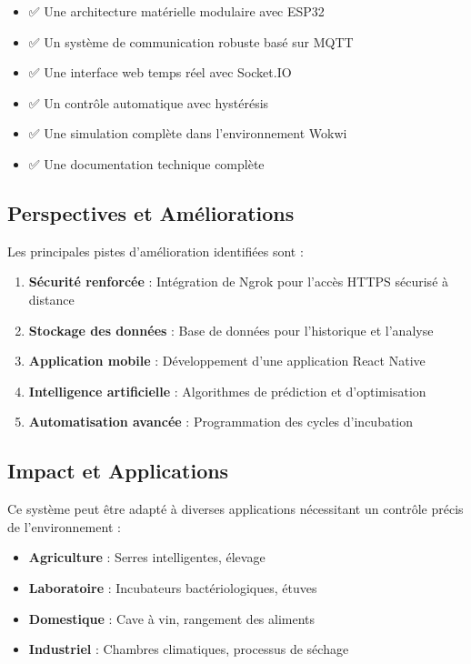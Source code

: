 \documentclass[12pt,a4paper]{article}
\begin{document}
\begin{itemize}
    \item ✅ Une architecture matérielle modulaire avec ESP32
    \item ✅ Un système de communication robuste basé sur MQTT
    \item ✅ Une interface web temps réel avec Socket.IO
    \item ✅ Un contrôle automatique avec hystérésis
    \item ✅ Une simulation complète dans l'environnement Wokwi
    \item ✅ Une documentation technique complète
\end{itemize}

\subsection{Perspectives et Améliorations}
Les principales pistes d'amélioration identifiées sont :

\begin{enumerate}
    \item \textbf{Sécurité renforcée} : Intégration de Ngrok pour l'accès HTTPS sécurisé à distance
    \item \textbf{Stockage des données} : Base de données pour l'historique et l'analyse
    \item \textbf{Application mobile} : Développement d'une application React Native
    \item \textbf{Intelligence artificielle} : Algorithmes de prédiction et d'optimisation
    \item \textbf{Automatisation avancée} : Programmation des cycles d'incubation
\end{enumerate}

\subsection{Impact et Applications}
Ce système peut être adapté à diverses applications nécessitant un contrôle précis de l'environnement :

\begin{itemize}
    \item \textbf{Agriculture} : Serres intelligentes, élevage
    \item \textbf{Laboratoire} : Incubateurs bactériologiques, étuves
    \item \textbf{Domestique} : Cave à vin, rangement des aliments
    \item \textbf{Industriel} : Chambres climatiques, processus de séchage
\end{itemize}
\end{document}

